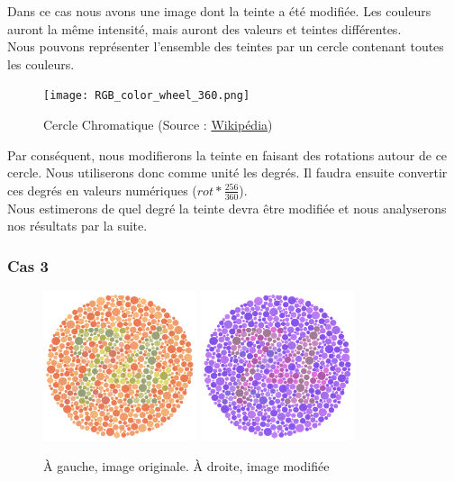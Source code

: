 \documentclass[a4paper]{article}
\begin{document}
Dans ce cas nous avons une image dont la teinte a été modifiée. Les couleurs auront la même intensité, mais auront des valeurs et teintes différentes.\\
Nous pouvons représenter l'ensemble des teintes par un cercle contenant toutes les couleurs.

\begin{figure}[H]
\begin{center}
\texttt{[image: RGB\_color\_wheel\_360.png]}
\end{center}
\caption{Cercle Chromatique (Source : \href{https://commons.wikimedia.org/wiki/File:RGB_color_wheel_360.svg}{Wikipédia})}
\end{figure}

Par conséquent, nous modifierons la teinte en faisant des rotations autour de ce cercle. Nous utiliserons donc comme unité les degrés. Il faudra ensuite convertir ces degrés en valeurs numériques ($rot * \frac{256}{360}$).\\

Nous estimerons de quel degré la teinte devra être modifiée et nous analyserons nos résultats par la suite.\\

\subsubsection{Cas 3}

\begin{figure}[H]
\begin{center}
\includegraphics[width=170px]{../base/cas_3_dalton74.png}
\includegraphics[width=170px]{../base/cas_3_dalton74_question3_1.png}
\end{center}
\caption{À gauche, image originale. À droite, image modifiée}
\end{figure}
\end{document}
